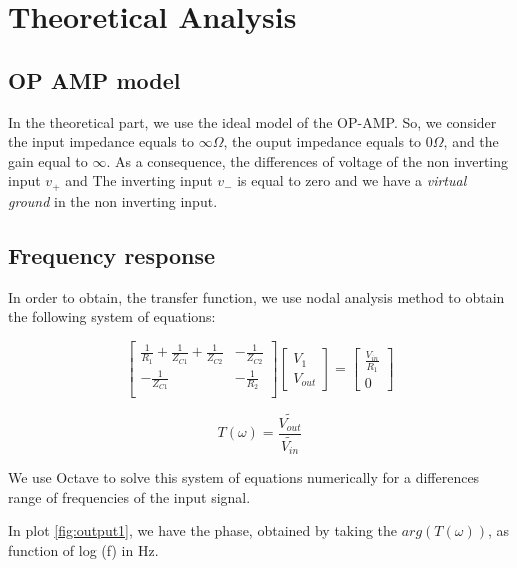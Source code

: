 \section{Theoretical Analysis}
\label{sec:analysis}

\subsection{OP AMP model}

In the theoretical part, we use the ideal model of the OP-AMP. So, we consider the input impedance equals to $\infty \Omega$, the ouput impedance
equals to $0 \Omega$, and the gain equal to $\infty$. As a consequence, the differences of voltage of the non inverting input $v_{+}$ and The
inverting input $v_{-}$ is equal to zero and we have a \textit{virtual ground} in the non inverting input.


\subsection{Frequency response}

In order to obtain, the transfer function, we use nodal analysis method to obtain the following system of equations:

\[
  \begin{bmatrix}
    \frac{1}{R_1} + \frac{1}{Z_{C1}} + \frac{1}{Z_{C2}} & -\frac{1}{Z_{C2}} \\
    -\frac{1}{Z_{C1}}                                   & -\frac{1}{R_2}    \\
  \end{bmatrix}
  \begin{bmatrix}
    V_{1} \\ V_{out}
  \end{bmatrix}
  =
  \begin{bmatrix}
    \frac{V_{in}}{R_1} \\ 0
  \end{bmatrix}
\]

\hfill



\begin{equation}
  T(\omega) = \frac{\widetilde{V_{out}}}{\widetilde{V_{in}}}
  \label{frequencyR}
\end{equation}

We use Octave to solve this system of equations numerically for a differences range of frequencies of the input signal.

In plot \ref{fig:output1}, we have the phase, obtained by taking the $arg(T(\omega))$, as function of log (f) in Hz.

